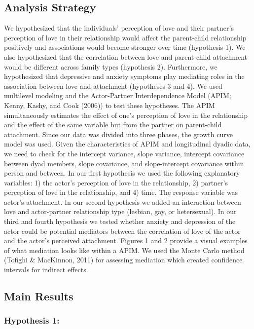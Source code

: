 \documentclass[man]{apa6}
\begin{document}
\hypertarget{analysis-strategy}{%
\subsection{Analysis Strategy}\label{analysis-strategy}}

We hypothesized that the individuals' perception of love and their partner's perception of love in their relationship would affect the parent-child relationship positively and associations would become stronger over time (hypothesis 1). We also hypothesized that the correlation between love and parent-child attachment would be different across family types (hypothesis 2). Furthermore, we hypothesized that depressive and anxiety symptoms play mediating roles in the association between love and attachment (hypotheses 3 and 4). We used multilevel modeling and the Actor-Partner Interdependence Model (APIM; Kenny, Kashy, and Cook (2006)) to test these hypotheses. The APIM simultaneously estimates the effect of one's perception of love in the relationship and the effect of the same variable but from the partner on parent-child attachment. Since our data was divided into three phases, the growth curve model was used. Given the characteristics of APIM and longitudinal dyadic data, we need to check for the intercept variance, slope variance, intercept covariance between dyad members, slope covariance, and slope-intercept covariance within person and between.
In our first hypothesis we used the following explanatory variables: 1) the actor's perception of love in the relationship, 2) partner's perception of love in the relationship, and 4) time. The response variable was actor's attachment. In our second hypothesis we added an interaction between love and actor-partner relationship type (lesbian, gay, or hetersexual).
In our third and fourth hypothesis we tested whether anxiety and depression of the actor could be potential mediators between the correlation of love of the actor and the actor's perceived attachment. Figures 1 and 2 provide a visual examples of what mediation looks like within a APIM. We used the Monte Carlo method (Tofighi \& MacKinnon, 2011) for assessing mediation which created confidence intervals for indirect effects.

\hypertarget{main-results}{%
\subsection{Main Results}\label{main-results}}

\hypertarget{hypothesis-1}{%
\subsubsection{Hypothesis 1:}\label{hypothesis-1}}
\end{document}
